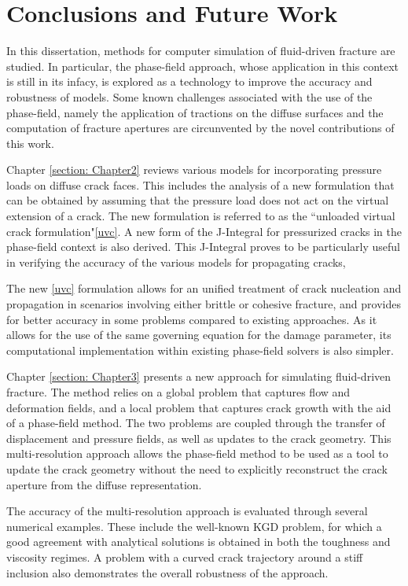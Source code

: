 \chapter{Conclusions and Future Work}
\label{section: Conclusions}

In this dissertation, methods for computer simulation of fluid-driven fracture are studied. In particular, the phase-field approach, whose application in this context is still in its infacy, is explored as a technology to improve the accuracy and robustness of models. Some known challenges associated with the use of the phase-field, namely the application of tractions on the diffuse surfaces and the computation of fracture apertures are circunvented by the novel contributions of this work. 

Chapter \ref{section: Chapter2} reviews various models for incorporating pressure loads on diffuse crack faces. This includes the analysis of a new formulation that can be obtained by assuming that the pressure load does not act on the virtual extension of a crack. The new formulation is referred to as the 
 ``unloaded virtual crack formulation"\eqref{uvc}. A new form of the J-Integral for pressurized cracks in the phase-field context is also derived. This J-Integral proves to be particularly useful in verifying the accuracy of the various models for propagating cracks,

The new \eqref{uvc} formulation allows for an unified treatment of crack nucleation and propagation in scenarios involving either brittle or cohesive fracture, and provides for better accuracy in some problems compared to existing approaches. As it allows for the use of the same governing equation for the damage parameter, its computational implementation within existing phase-field solvers is also simpler. 

Chapter \ref{section: Chapter3} presents a new approach for simulating fluid-driven fracture. The method relies on a global problem that captures flow and deformation fields, and a local problem that captures crack growth with the aid of a phase-field method. The two problems are coupled through the transfer of displacement and pressure fields, as well as updates to the crack geometry. This multi-resolution approach allows the phase-field method to be used as a tool to update the crack geometry without the need to explicitly reconstruct the crack aperture from the diffuse representation.  

The accuracy of the multi-resolution approach is evaluated through several numerical examples. These include the well-known KGD problem, for which a good agreement with analytical solutions is obtained in both the toughness and viscosity regimes. A problem with a curved crack trajectory around a stiff inclusion also demonstrates the overall robustness of the approach.  

